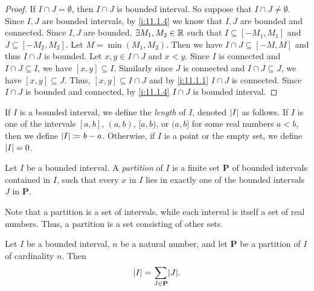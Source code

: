 \begin{proof}
  If \(I \cap J = \emptyset\), then \(I \cap J\) is bounded interval.
  So suppose that \(I \cap J \neq \emptyset\).
  Since \(I, J\) are bounded intervals, by \cref{i:11.1.4} we know that \(I, J\) are bounded and connected.
  Since \(I, J\) are bounded, \(\exists M_1, M_2 \in \mathbb{R}\) such that \(I \subseteq [-M_1, M_1]\) and \(J \subseteq [-M_2, M_2]\).
  Let \(M = \min(M_1, M_2)\).
  Then we have \(I \cap J \subseteq [-M, M]\) and thus \(I \cap J\) is bounded.
  Let \(x, y \in I \cap J\) and \(x < y\).
  Since \(I\) is connected and \(I \cap J \subseteq I\), we have \([x, y] \subseteq I\).
  Similarly since \(J\) is connected and \(I \cap J \subseteq J\), we have \([x, y] \subseteq J\).
  Thus, \([x, y] \subseteq I \cap J\) and by \cref{i:11.1.1} \(I \cap J\) is connected.
  Since \(I \cap J\) is bounded and connected, by \cref{i:11.1.4} \(I \cap J\) is bounded interval.
\end{proof}

\setcounter{thm}{7}
\begin{defn}\label{i:11.1.8}
  If \(I\) is a bounded interval, we define the \emph{length} of \(I\), denoted \(\left\lvert I\right\rvert\) as follows.
  If \(I\) is one of the intervals \([a, b]\), \((a, b)\), \([a, b)\), or \((a, b]\) for some real numbers \(a < b\), then we define \(\left\lvert I\right\rvert \coloneqq b - a\).
  Otherwise, if \(I\) is a point or the empty set, we define \(\left\lvert I\right\rvert = 0\).
\end{defn}

\setcounter{thm}{9}
\begin{defn}[Partitions]\label{i:11.1.10}
  Let \(I\) be a bounded interval.
  A \emph{partition} of \(I\) is a finite set \(\mathbf{P}\) of bounded intervals contained in \(I\), such that every \(x\) in \(I\) lies in exactly one of the bounded intervals \(J\) in \(\mathbf{P}\).
\end{defn}

\begin{rmk}\label{i:11.1.11}
  Note that a partition is a set of intervals, while each interval is itself a set of real numbers.
  Thus, a partition is a set consisting of other sets.
\end{rmk}

\setcounter{thm}{12}
\begin{thm}\label{i:11.1.13}
  Let \(I\) be a bounded interval, \(n\) be a natural number, and let \(\mathbf{P}\) be a partition of \(I\) of cardinality \(n\).
  Then
  \[
    \abs{I} = \sum_{J \in \mathbf{P}} \abs{J}.
  \]
\end{thm}

